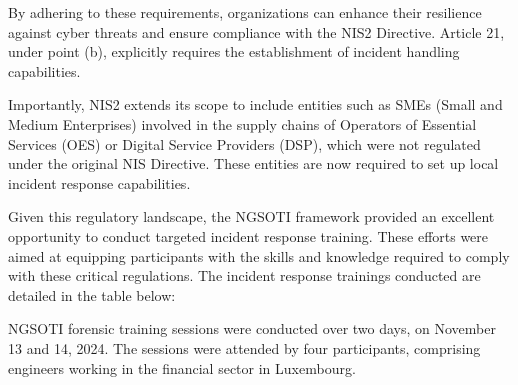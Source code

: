 By adhering to these requirements, organizations can enhance their resilience against cyber threats and ensure compliance with the NIS2 Directive. Article 21, under point (b), explicitly requires the establishment of incident handling capabilities.

Importantly, NIS2 extends its scope to include entities such as SMEs (Small and Medium Enterprises) involved in the supply chains of Operators of Essential Services (OES) or Digital Service Providers (DSP), which were not regulated under the original NIS Directive. These entities are now required to set up local incident response capabilities.

Given this regulatory landscape, the NGSOTI framework provided an excellent opportunity to conduct targeted incident response training. These efforts were aimed at equipping participants with the skills and knowledge required to comply with these critical regulations. The incident response trainings conducted are detailed in the table below:


NGSOTI forensic training sessions were conducted over two days, on November 13 and 14, 2024. The sessions were attended by four participants, comprising engineers working in the financial sector in Luxembourg.



